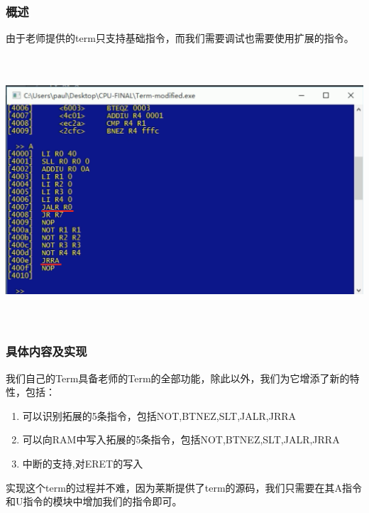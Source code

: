 \subsubsection{概述}
由于老师提供的term只支持基础指令，而我们需要调试也需要使用扩展的指令。

\begin{center}
    \includegraphics[height=10cm]{image/extension/term}
    \label{fig:term}
\end{center}

\subsubsection{具体内容及实现}
我们自己的Term具备老师的Term的全部功能，除此以外，我们为它增添了新的特性，包括：
\begin{enumerate}
    \item 可以识别拓展的5条指令，包括NOT,BTNEZ,SLT,JALR,JRRA
    \item 可以向RAM中写入拓展的5条指令，包括NOT,BTNEZ,SLT,JALR,JRRA
    \item 中断的支持,对ERET的写入
\end{enumerate}

实现这个term的过程并不难，因为莱斯提供了term的源码，我们只需要在其A指令和U指令的模块中增加我们的指令即可。


